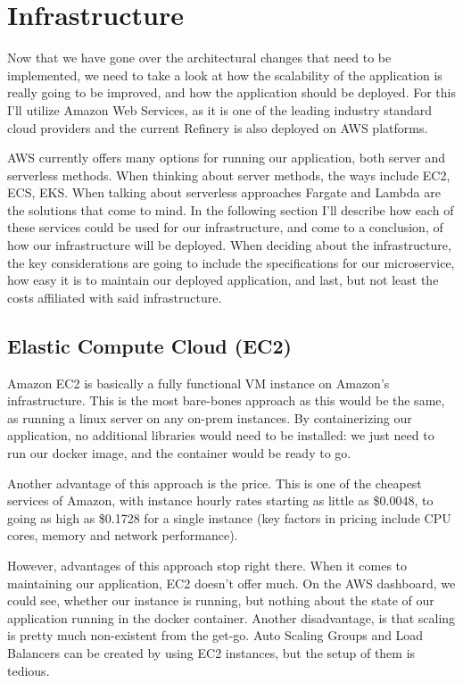 \section{Infrastructure}

	Now that we have gone over the architectural changes that need to be implemented, we need to take a look at how the 
	scalability of the application is really going to be improved, and how the application should be deployed.
	For this I'll utilize Amazon Web Services, as it is one of the leading industry standard cloud providers
	and the current Refinery is also deployed on AWS platforms.

	AWS currently offers many options for running our application, both server and serverless methods.
	When thinking about server methods, the ways include EC2, ECS, EKS. When talking about serverless approaches
	Fargate and Lambda are the solutions that come to mind. In the following section I'll describe how each of these
	services could be used for our infrastructure, and come to a conclusion, of how our infrastructure will be deployed.
	When deciding about the infrastructure, the key considerations are going to include the specifications for our microservice,
	how easy it is to maintain our deployed application, and last, but not least the costs affiliated with said infrastructure.


	\subsection{Elastic Compute Cloud (EC2)}
		Amazon EC2 is basically a fully functional VM instance on Amazon's infrastructure. This is the most bare-bones approach as this
		would be the same, as running a linux server on any on-prem instances. 
		By containerizing our application, no additional libraries
		would need to be installed: we just need to run our docker image, and the container would be ready to go. 
		
		Another advantage of this approach
		is the price. This is one of the cheapest services of Amazon, with instance hourly rates starting as little as \$0.0048, to going as high as 
		\$0.1728 for a single instance (key factors in pricing include CPU cores, memory and network performance).

		However, advantages of this approach stop right there. When it comes to maintaining our application, EC2 doesn't offer much.
		On the AWS dashboard, we could see, whether our instance is running, but nothing about the state of our application running in 
		the docker container. Another disadvantage, is that scaling is pretty much non-existent from the get-go. Auto Scaling Groups and Load Balancers
		can be created by using EC2 instances, but the setup of them is tedious. 

